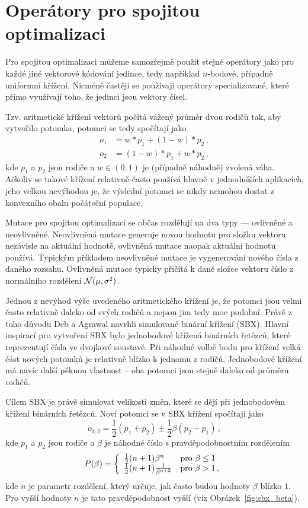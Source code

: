 \section{Operátory pro spojitou optimalizaci}

Pro spojitou optimalizaci můžeme samozřejmě použít stejné operátory jako pro každé jiné vektorové kódování jedince, tedy například $n$-bodové, případně uniformní křížení. Nicméně častěji se používají operátory specializované, které přímo využívají toho, že jedinci jsou vektory čísel.

Tzv. aritmetické křížení vektorů počítá vážený průměr dvou rodičů tak, aby vytvořilo potomka, potomci se tedy spočítají jako
\begin{align*}
o_1 & = w*p_1 + (1-w)* p_2\,, \\
o_2 & = (1-w)*p_1 + w* p_2\,,
\end{align*}
kde $p_1$ a $p_2$ jsou rodiče a $w \in (0,1)$ je (případně náhodně) zvolená váha. Ačkoliv se takové křížení relativně často používá hlavně v jednodušších aplikacích, jeho velkou nevýhodou je, že výslední potomci se nikdy nemohou dostat z konvexního obalu počáteční populace.

Mutace pro spojitou optimalizaci se občas rozdělují na dva typy --- ovlivněné a neovlivněné. Neovlivněná mutace generuje novou hodnotu pro složku vektoru nezávisle na aktuální hodnotě, ovlivněná mutace naopak aktuální hodnotu používá. Typickým příkladem neovlivněné mutace je vygenerování nového čísla z daného rozsahu. Ovlivněná mutace typicky přičítá k dané složce vektoru číslo z normálního rozdělení $\mathcal{N}(\mu, \sigma^2)$.

Jednou z nevýhod výše uvedeného aritmetického křížení je, že potomci jsou velmi často relativně daleko od svých rodičů a nejsou jim tedy moc podobní. Právě z toho důvodu Deb a Agrawal navrhli simulované binární křížení (SBX)\cite{agrawal1995simulated}. Hlavní inspirací pro vytvoření SBX bylo jednobodové křížená binárních řetězců, které reprezentují čísla ve dvojkové soustavě. Při náhodné volbě bodu pro křížení velká část nových potomků je relativně blízko k jednomu z rodičů. Jednobodové křížení má navíc další pěknou vlastnost -- oba potomci jsou stejně daleko od průměru rodičů. 

Cílem SBX je právě simulovat velikosti změn, které se dějí při jednobodovém křížení binárních řetězců. Noví potomci se v SBX křížení spočítají jako 
$$o_{1,2} = \frac{1}{2}(p_1 + p_2) \pm \frac{1}{2}\beta(p_2 - p_1)\,,$$ kde $p_1$ a $p_2$ jsou rodiče a $\beta$ je náhodné číslo s pravděpodobnostním rozdělením
$$P(\beta) = \left\{ \begin{array}{ll} \frac{1}{2} (n+1) \beta^n & \text{pro } \beta \leq 1 \\ \frac{1}{2} (n+1) \frac{1}{\beta^{n+2}} & \text{pro } \beta>1\,, \end{array} \right.$$
kde $n$ je parametr rozdělení, který určuje, jak často budou hodnoty $\beta$ blízko $1$. Pro vyšší hodnoty $n$ je tato pravděpodobnost vyšší (viz Obrázek~\ref{fig:sbx_beta}). 

